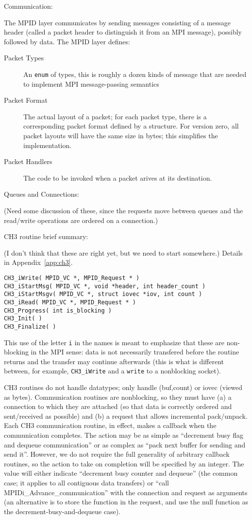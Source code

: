 \documentclass{article}
\def\code#1{\texttt{#1}}
\begin{document}
Communication:

The MPID layer communicates by sending messages consisting of a message header
(called a packet header to distinguish it from an MPI message), possibly
followed by data.  The MPID layer defines:
\begin{description}
\item[Packet Types]An \code{enum} of types, this is roughly a dozen kinds of
  message that are needed to implement MPI message-passing semantics
\item[Packet Format]The actual layout of a packet; for each packet type, there
  is a corresponding packet format defined by a structure.  For version zero,
  all packet layouts will have the same size in bytes; this simplifies
  the implementation.
\item[Packet Handlers]The code to be invoked when a packet arives at its
  destination. 
\end{description}

Queues and Connections:

(Need some discussion of these, since the requests move between queues and the 
read/write operations are ordered on a connection.)

CH3 routine brief summary:

(I don't think that these are right yet, but we need to start somewhere.)
Details in Appendix~\ref{app:ch3}.

\begin{verbatim}
CH3_iWrite( MPID_VC *, MPID_Request * )
CH3_iStartMsg( MPID_VC *, void *header, int header_count )
CH3_iStartMsgv( MPID_VC *, struct iovec *iov, int count )
CH3_iRead( MPID_VC *, MPID_Request * )
CH3_Progress( int is_blocking )
CH3_Init( )
CH3_Finalize( )
\end{verbatim}

This use of the letter \code{i} in the names is meant to emphasize that these
are non-blocking in the MPI sense: data is not necessarily transfered before
the routine returns and the transfer may continue afterwards (this is what is
different between, for example, \code{CH3_iWrite} and a \code{write} to a
nonblocking socket).

CH3 routines do not handle datatypes; only handle (buf,count) or iovec (viewed
as bytes).  Communication routines are nonblocking, so they must have (a) a
connection to which they are attached (so that data is correctly ordered and
sent/received as possible) and (b) a request that allows incremental
pack/unpack.  Each CH3 communication routine, in effect, makes a callback when
the communication completes.  The action may be as simple as ``decrement busy
flag and dequeue communication'' or as complex as ``pack next buffer for
sending and send it''.  However, we do not require the full generality of
arbitrary callback routines, so the action to take on completion will be
specified by an integer.  The value will either indicate ``decrement busy
counter and dequeue'' (the common case; it applies to all contiguous data
transfers) or ``call MPIDi_Advance_communication'' with the connection and
request as arguments (an alternative is to store the function in the request,
and use the null function as the decrement-busy-and-dequeue case).
\end{document}
